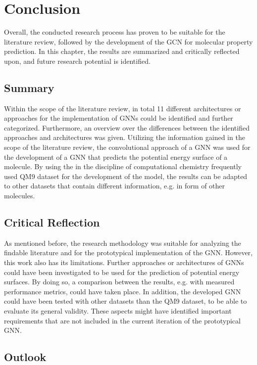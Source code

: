 \section{Conclusion}
Overall, the conducted research process has proven to be suitable for the literature review, followed by the development of the GCN for molecular property prediction. In this chapter, the results are summarized and critically reflected upon, and future research potential is identified. 

\subsection{Summary}

Within the scope of the literature review, in total 11 different architectures or approaches for the implementation of GNNs could be identified and further categorized. Furthermore, an overview over the differences between the identified approaches and architectures was given. Utilizing the information gained in the scope of the literature review, the convolutional approach of a GNN was used for the development of a GNN that predicts the potential energy surface of a molecule. By using the in the discipline of computational chemistry frequently used QM9 dataset for the development of the model, the results can be adapted to other datasets that contain different information, e.g. in form of other molecules. 

\subsection{Critical Reflection}
As mentioned before, the research methodology was suitable for analyzing the findable literature and for the prototypical implementation of the GNN. However, this work also has its limitations. Further approaches or architectures of GNNs could have been investigated to be used for the prediction of potential energy surfaces. By doing so, a comparison between the results, e.g. with measured performance metrics, could have taken place. In addition, the developed GNN could have been tested with other datasets than the QM9 dataset, to be able to evaluate its general validity. These aspects might have identified important requirements that are not included in the current iteration of the prototypical GNN.

\subsection{Outlook}

